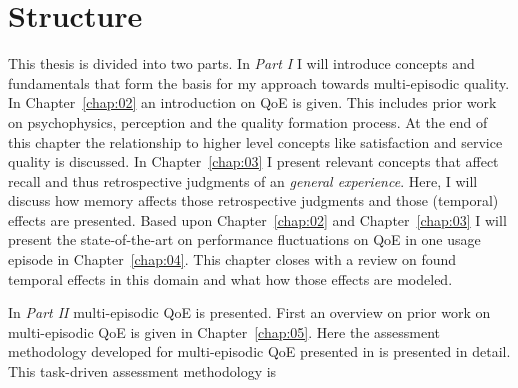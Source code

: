 \section{Structure}
This thesis is divided into two parts.
In \emph{Part I} I will introduce concepts and fundamentals that form the basis for my approach towards multi-episodic quality.
In Chapter~\ref{chap:02} an introduction on \ac{QoE} is given.
This includes prior work on psychophysics, perception and the quality formation process.
At the end of this chapter the relationship to higher level concepts like satisfaction and service quality is discussed.
In Chapter~\ref{chap:03} I present relevant concepts that affect recall and thus retrospective judgments of an \emph{general experience}.
Here, I will discuss how memory affects those retrospective judgments and those (temporal) effects are presented.
Based upon Chapter~\ref{chap:02} and Chapter~\ref{chap:03} I will present the state-of-the-art on performance fluctuations on QoE in one usage episode in Chapter~\ref{chap:04}.
This chapter closes with a review on found temporal effects in this domain and what how those effects are modeled.

In \emph{Part II} multi-episodic QoE is presented.
First an overview on prior work on multi-episodic QoE is given in Chapter~\ref{chap:05}.
Here the assessment methodology developed for multi-episodic QoE presented in \cite{moller_single-call_2011} is presented in detail.
This task-driven assessment methodology is 																													